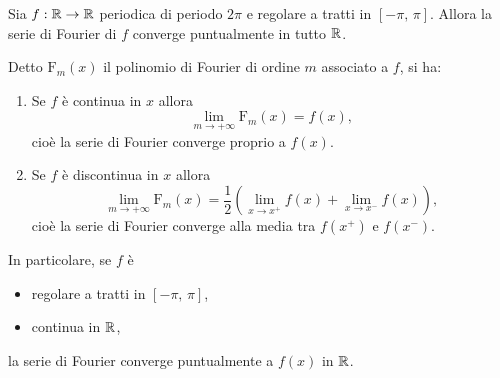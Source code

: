 \documentclass[../../analisi2]{subfiles}
\begin{document}
        \begin{teorema}
            Sia \(f : \mathbb{R} \to \mathbb{R}\) periodica di periodo \(2\pi\) e regolare a tratti in \([-\pi, \, \pi]\). Allora la serie di Fourier di
            \(f\) converge puntualmente in tutto \(\mathbb{R}\).

            Detto \(\mathrm{F}_m (x)\) il polinomio di Fourier di ordine \(m\) associato a \(f\), si ha:
            \begin{enumerate}
                \item Se \(f\) è continua in \(x\) allora
                    \[
                        \lim_{m \to +\infty} \mathrm{F}_m (x) = f(x),
                    \]
                    cioè la serie di Fourier converge proprio a \(f(x)\).
                \item Se \(f\) è discontinua in \(x\) allora
                    \[
                        \lim_{m \to +\infty} \mathrm{F}_m (x) = \frac{1}{2} \left(\lim_{x \to x^+} f(x) + \lim_{x \to x^-} f(x)\right),
                    \]
                    cioè la serie di Fourier converge alla media tra \(f(x^+)\) e \(f(x^-)\).
            \end{enumerate}
        \end{teorema}
        \begin{osservazione}
            In particolare, se \(f\) è
            \begin{itemize}
                \item regolare a tratti in \([-\pi, \, \pi]\),
                \item continua in \(\mathbb{R}\),
            \end{itemize}
            la serie di Fourier converge puntualmente a \(f(x)\) in \(\mathbb{R}\).
        \end{osservazione}
\end{document}
